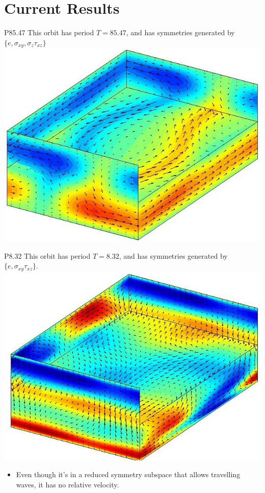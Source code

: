 \documentclass[10pt]{beamer}
\begin{document}
\section{Current Results}
\begin{frame}{P85.47}
This orbit has period $T = 85.47$, and has symmetries generated by $\{e,\sigma_{xy},\sigma_{z}\tau_{xz}\} $
\vbox{\includegraphics[scale=0.45]{Data/p85p47NoBase}}
\end{frame}
\begin{frame}{P8.32}
This orbit has period $T = 8.32$, and has symmetries generated by $\{e,\sigma_{xy}\tau_{xz}\}$. 
\vbox{\includegraphics[scale=0.4]{Data/p8p32NoBase}}
\begin{itemize}
\item<1-> Even though it's in a reduced symmetry subspace that allows travelling waves, it has no relative velocity.
\end{itemize}
\end{frame}
\end{document}
